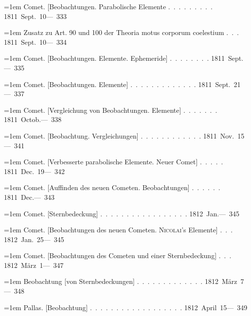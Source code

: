 \noindent\hangindent=1em Comet. [Beobachtungen. Parabolische Elemente \mbox{.\ .\ .\ .\ .\ .\ .\ .\ .} \hfill\mbox{1811 Sept. 10}\quad\mbox{--- 333}\par\smallskip
\noindent\hangindent=1em Zusatz zu Art. 90 und 100 der Theoria motus corporum coelestium \mbox{.\ .\ .} \hfill\mbox{1811 Sept. 10}\quad\mbox{--- 334}\par\smallskip
\noindent\hangindent=1em Comet. [Beobachtungen. Elemente. Ephemeride] \mbox{.\ .\ .\ .\ .\ .\ .\ .} \hfill\mbox{1811 Sept.}\quad\mbox{--- 335}\par\smallskip
\noindent\hangindent=1em Comet. [Beobachtungen. Elemente] \mbox{.\ .\ .\ .\ .\ .\ .\ .\ .\ .\ .\ .\ .} \hfill\mbox{1811 Sept. 21}\quad\mbox{--- 337}\par\smallskip
\noindent\hangindent=1em Comet. [Vergleichung von Beobachtungen. Elemente] \mbox{.\ .\ .\ .\ .\ .\ .} \hfill\mbox{1811 Octob.}\quad\mbox{--- 338}\par\smallskip
\noindent\hangindent=1em Comet. [Beobachtung. Vergleichungen] \mbox{.\ .\ .\ .\ .\ .\ .\ .\ .\ .\ .\ .} \hfill\mbox{1811 Nov. 15}\quad\mbox{--- 341}\par\smallskip
\noindent\hangindent=1em Comet. [Verbesserte parabolische Elemente. Neuer Comet] \mbox{.\ .\ .\ .\ .} \hfill\mbox{1811 Dec. 19}\quad\mbox{--- 342}\par\smallskip
\noindent\hangindent=1em Comet. [Auffinden des neuen Cometen. Beobachtungen] \mbox{.\ .\ .\ .\ .\ .} \hfill\mbox{1811 Dec.}\quad\mbox{--- 343}\par\smallskip
\noindent\hangindent=1em Comet. [Sternbedeckung] \mbox{.\ .\ .\ .\ .\ .\ .\ .\ .\ .\ .\ .\ .\ .\ .\ .\ .} \hfill\mbox{1812 Jan.}\quad\mbox{--- 345}\par\smallskip
\noindent\hangindent=1em Comet. [Beobachtungen des neuen Cometen. \textsc{Nicolai}'s Elemente] \mbox{.\ .\ .} \hfill\mbox{1812 Jan. 25}\quad\mbox{--- 345}\par\smallskip
\noindent\hangindent=1em Comet. [Beobachtungen des Cometen und einer Sternbedeckung] \mbox{.\ .\ .} \hfill\mbox{1812 März 1}\quad\mbox{--- 347}\par\smallskip
\noindent\hangindent=1em Beobachtung [von Sternbedeckungen] \mbox{.\ .\ .\ .\ .\ .\ .\ .\ .\ .\ .\ .\ .} \hfill\mbox{1812 März 7}\quad\mbox{--- 348}\par\smallskip
\noindent\hangindent=1em Pallas. [Beobachtung] \mbox{.\ .\ .\ .\ .\ .\ .\ .\ .\ .\ .\ .\ .\ .\ .\ .\ .\ .} \hfill\mbox{1812 April 15}\quad\mbox{--- 349}\par\smallskip
